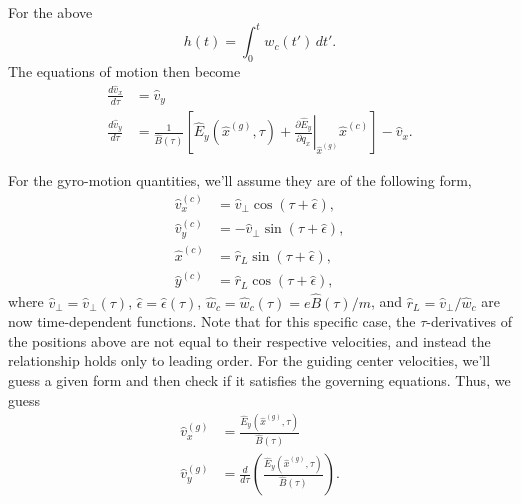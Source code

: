 \documentclass[a4paper,11pt]{report}
\begin{document}
For the above
\begin{equation}
    h(t) = \int_0^t w_c(t') \, dt'.
\end{equation}
The equations of motion then become
\begin{align}
\label{eq:time_var_B_inter_1}
    \frac{d \hat{v}_x}{d \tau} &= \hat{v}_y \nonumber \\
    \frac{d \hat{v}_y}{d \tau} &= \frac{1}{\hat{B}(\tau)} \left [ \hat{E}_y(\hat{x}^{(g)},\tau) + \left .\frac{\partial \hat{E}_y}{\partial q_x} \right |_{\hat{x}^{(g)}} \hat{x}^{(c)} \right ] - \hat{v}_x.
\end{align}

For the gyro-motion quantities, we'll assume they are of the following form,
\begin{align}
    \hat{v}_x^{(c)} &= \hat{v}_\perp \cos(\tau + \hat{\epsilon}), \\
    \hat{v}_y^{(c)} &= -\hat{v}_\perp \sin(\tau + \hat{\epsilon}), \\
    \hat{x}^{(c)} &= \hat{r}_L \sin(\tau + \hat{\epsilon}), \\
    \hat{y}^{(c)} &= \hat{r}_L \cos(\tau + \hat{\epsilon}),
\end{align} 
where $\hat{v}_\perp = \hat{v}_\perp(\tau)$, $\hat{\epsilon} = \hat{\epsilon}(\tau)$, $\hat{w}_c = \hat{w}_c(\tau) = e \hat{B}(\tau)/m$, and $\hat{r}_L = \hat{v}_\perp / \hat{w}_c$ are now time-dependent functions. Note that for this specific case, the $\tau$-derivatives of the positions above are not equal to their respective velocities, and instead the relationship holds only to leading order. For the guiding center velocities, we'll guess a given form and then check if it satisfies the governing equations. Thus, we guess
\begin{align}
    \hat{v}_x^{(g)} &= \frac{\hat{E}_y(\hat{x}^{(g)},\tau)}{\hat{B}(\tau)} \nonumber \\
    \hat{v}_y^{(g)} &= \frac{d}{d \tau} \left ( \frac{\hat{E}_y(\hat{x}^{(g)},\tau)}{\hat{B}(\tau)} \right ).
\end{align}
\end{document}
